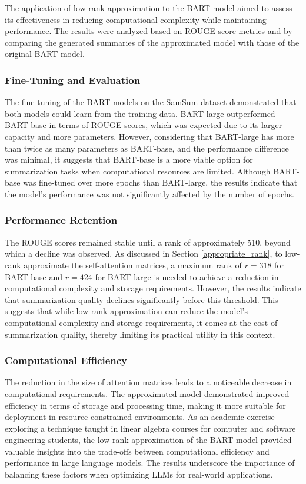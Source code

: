 The application of low-rank approximation to the BART model aimed to assess its effectiveness in reducing computational complexity while maintaining performance. The results were analyzed based on ROUGE score metrics and by comparing the generated summaries of the approximated model with those of the original BART model.

\subsubsection{Fine-Tuning and Evaluation}
The fine-tuning of the BART models on the SamSum dataset demonstrated that both models could learn from the training data. BART-large outperformed BART-base in terms of ROUGE scores, which was expected due to its larger capacity and more parameters. However, considering that BART-large has more than twice as many parameters as BART-base, and the performance difference was minimal, it suggests that BART-base is a more viable option for summarization tasks when computational resources are limited. Although BART-base was fine-tuned over more epochs than BART-large, the results indicate that the model's performance was not significantly affected by the number of epochs.

\subsubsection{Performance Retention}

The ROUGE scores remained stable until a rank of approximately 510, beyond which a decline was observed. As discussed in Section \ref{appropriate_rank}, to low-rank approximate the self-attention matrices, a maximum rank of $r = 318$ for BART-base and $r = 424$ for BART-large is needed to achieve a reduction in computational complexity and storage requirements. However, the results indicate that summarization quality declines significantly before this threshold. This suggests that while low-rank approximation can reduce the model's computational complexity and storage requirements, it comes at the cost of summarization quality, thereby limiting its practical utility in this context.

\subsubsection{Computational Efficiency}

The reduction in the size of attention matrices leads to a noticeable decrease in computational requirements. The approximated model demonstrated improved efficiency in terms of storage and processing time, making it more suitable for deployment in resource-constrained environments. As an academic exercise exploring a technique taught in linear algebra courses for computer and software engineering students, the low-rank approximation of the BART model provided valuable insights into the trade-offs between computational efficiency and performance in large language models. The results underscore the importance of balancing these factors when optimizing LLMs for real-world applications.

